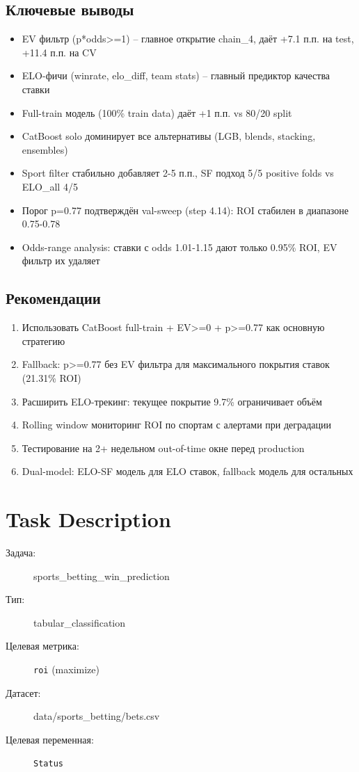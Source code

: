 \documentclass[12pt,a4paper]{article}
\begin{document}
\subsection{Ключевые выводы}
\begin{itemize}
  \item EV фильтр (p*odds>=1) -- главное открытие chain\_4, даёт +7.1 п.п. на test, +11.4 п.п. на CV
  \item ELO-фичи (winrate, elo\_diff, team stats) -- главный предиктор качества ставки
  \item Full-train модель (100\% train data) даёт +1 п.п. vs 80/20 split
  \item CatBoost solo доминирует все альтернативы (LGB, blends, stacking, ensembles)
  \item Sport filter стабильно добавляет 2-5 п.п., SF подход 5/5 positive folds vs ELO\_all 4/5
  \item Порог p=0.77 подтверждён val-sweep (step 4.14): ROI стабилен в диапазоне 0.75-0.78
  \item Odds-range analysis: ставки с odds 1.01-1.15 дают только 0.95\% ROI, EV фильтр их удаляет
\end{itemize}

\subsection{Рекомендации}
\begin{enumerate}
  \item Использовать CatBoost full-train + EV>=0 + p>=0.77 как основную стратегию
  \item Fallback: p>=0.77 без EV фильтра для максимального покрытия ставок (21.31\% ROI)
  \item Расширить ELO-трекинг: текущее покрытие 9.7\% ограничивает объём
  \item Rolling window мониторинг ROI по спортам с алертами при деградации
  \item Тестирование на 2+ недельном out-of-time окне перед production
  \item Dual-model: ELO-SF модель для ELO ставок, fallback модель для остальных
\end{enumerate}




\section{Task Description}

\begin{description}
    \item[Задача:] sports\_betting\_win\_prediction
    \item[Тип:] tabular\_classification
    \item[Целевая метрика:] \texttt{roi}
        (maximize)
    \item[Датасет:] data/sports\_betting/bets.csv
    \item[Целевая переменная:] \texttt{Status}
\end{description}
\end{document}
